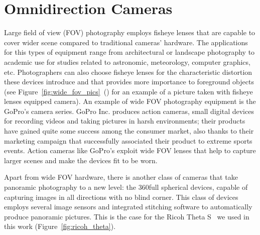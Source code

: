 \section{Omnidirection Cameras}
Large field of view (FOV) photography employs fisheye lenses that are capable to cover 
wider scene compared to traditional cameras' hardware.
The applications for this types of equipment range from architectural or 
landscape photography to academic use for studies related to astronomic, 
meteorology, computer graphics, etc.
Photographers can also choose fisheye lenses for the characteristic distortion
these devices introduce and that provides more importance to foreground objects
(see Figure~\ref{fig:wide_fov_pics}~() for an 
example of a picture taken with fisheye lenses equipped camera).
An example of wide FOV photography equipment is the GoPro's camera series.
GoPro Inc. produces action cameras, small digital devices for recording videos 
and taking pictures in harsh environments; their products have gained quite 
some success among the consumer market, also thanks to their marketing campaign 
that successfully associated their product to extreme sports events.
Action cameras like GoPro's exploit wide FOV lenses that help to capture larger
scenes and make the devices fit to be worn.

Apart from wide FOV hardware, there is another class of  
cameras that take panoramic photography to a new level: 
the 360\degree full spherical devices, capable of capturing images
in all directions with no blind corner. This class of devices employs 
several image sensors and integrated stitching software to automatically produce
panoramic pictures. This is the case for the Ricoh Theta S~\cite{theta_website}
we used in this work (Figure~\ref{fig:ricoh_theta}).

